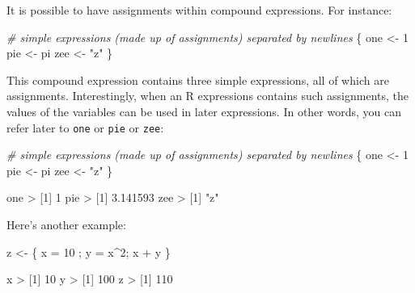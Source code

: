 \documentclass[
]{book}
\newenvironment{Shaded}{\begin{snugshade}}{\end{snugshade}}
\newcommand{\CommentTok}[1]{\textcolor[rgb]{0.56,0.35,0.01}{\textit{#1}}}
\newcommand{\DecValTok}[1]{\textcolor[rgb]{0.00,0.00,0.81}{#1}}
\newcommand{\FloatTok}[1]{\textcolor[rgb]{0.00,0.00,0.81}{#1}}
\newcommand{\NormalTok}[1]{#1}
\newcommand{\OtherTok}[1]{\textcolor[rgb]{0.56,0.35,0.01}{#1}}
\newcommand{\SpecialCharTok}[1]{\textcolor[rgb]{0.00,0.00,0.00}{#1}}
\newcommand{\StringTok}[1]{\textcolor[rgb]{0.31,0.60,0.02}{#1}}
\begin{document}
It is possible to have assignments within compound expressions. For instance:

\begin{Shaded}
\begin{Highlighting}[]
\CommentTok{\# simple expressions (made up of assignments) separated by newlines}
\NormalTok{\{}
\NormalTok{  one }\OtherTok{\textless{}{-}} \DecValTok{1}
\NormalTok{  pie }\OtherTok{\textless{}{-}}\NormalTok{ pi}
\NormalTok{  zee }\OtherTok{\textless{}{-}} \StringTok{"z"}
\NormalTok{\}}
\end{Highlighting}
\end{Shaded}

This compound expression contains three simple expressions, all of which are
assignments. Interestingly, when an R expressions contains such assignments, the
values of the variables can be used in later expressions. In other words, you
can refer later to \texttt{one} or \texttt{pie} or \texttt{zee}:

\begin{Shaded}
\begin{Highlighting}[]
\CommentTok{\# simple expressions (made up of assignments) separated by newlines}
\NormalTok{\{}
\NormalTok{  one }\OtherTok{\textless{}{-}} \DecValTok{1}
\NormalTok{  pie }\OtherTok{\textless{}{-}}\NormalTok{ pi}
\NormalTok{  zee }\OtherTok{\textless{}{-}} \StringTok{"z"}
\NormalTok{\}}

\NormalTok{one}
\SpecialCharTok{\textgreater{}}\NormalTok{ [}\DecValTok{1}\NormalTok{] }\DecValTok{1}
\NormalTok{pie}
\SpecialCharTok{\textgreater{}}\NormalTok{ [}\DecValTok{1}\NormalTok{] }\FloatTok{3.141593}
\NormalTok{zee}
\SpecialCharTok{\textgreater{}}\NormalTok{ [}\DecValTok{1}\NormalTok{] }\StringTok{"z"}
\end{Highlighting}
\end{Shaded}

Here's another example:

\begin{Shaded}
\begin{Highlighting}[]
\NormalTok{z }\OtherTok{\textless{}{-}}\NormalTok{ \{ x }\OtherTok{=} \DecValTok{10}\NormalTok{ ; y }\OtherTok{=}\NormalTok{ x}\SpecialCharTok{\^{}}\DecValTok{2}\NormalTok{; x }\SpecialCharTok{+}\NormalTok{ y \}}

\NormalTok{x}
\SpecialCharTok{\textgreater{}}\NormalTok{ [}\DecValTok{1}\NormalTok{] }\DecValTok{10}
\NormalTok{y}
\SpecialCharTok{\textgreater{}}\NormalTok{ [}\DecValTok{1}\NormalTok{] }\DecValTok{100}
\NormalTok{z}
\SpecialCharTok{\textgreater{}}\NormalTok{ [}\DecValTok{1}\NormalTok{] }\DecValTok{110}
\end{Highlighting}
\end{Shaded}
\end{document}
